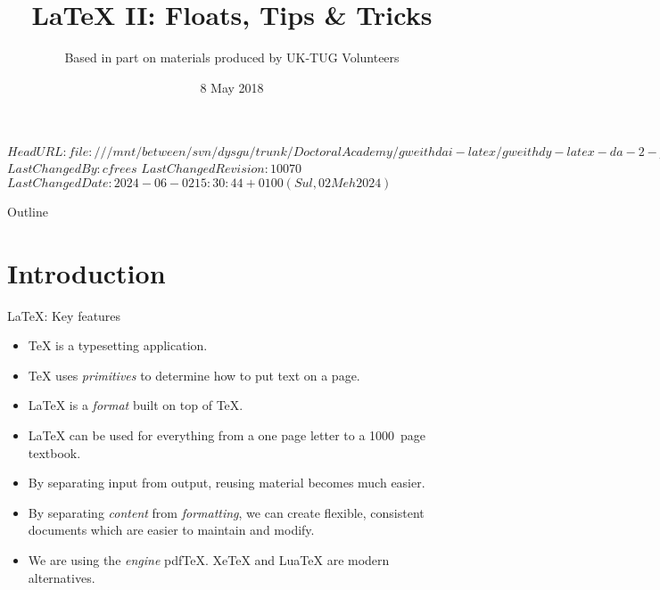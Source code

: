 \svnidlong
{$HeadURL: file:///mnt/between/svn/dysgu/trunk/DoctoralAcademy/gweithdai-latex/gweithdy-latex-da-2-pellach/training.tex $}
{$LastChangedBy: cfrees $}
{$LastChangedRevision: 10070 $}
{$LastChangedDate: 2024-06-02 15:30:44 +0100 (Sul, 02 Meh 2024) $}

\usepackage[citestyle=authoryear-comp,bibstyle=authoryear,mergedate=basic,isbn=false,url=true,sortcites=true,backend=biber,mincrossrefs=6]{biblatex}




{
  \usetikzlibrary{quotes,automata,positioning,bending,shadows,shapes.arrows}
  \usepackage{tikz-cd}
}


\title{\LaTeX{} II: Floats, Tips \& Tricks}
\subtitle{Based in part on materials produced by UK-TUG Volunteers}
\date{ 8 May 2018}




\begin{frame}
  \titlepage
\end{frame}

\maketitle


\tableofcontents

%
{
  \begin{frame}{Outline}
	\tableofcontents
  \end{frame}
}

%

\section{Introduction}

\begin{frame}{\LaTeX{}: Key features}

  \begin{itemize}
	\item \TeX{} is a typesetting application.
	\item \TeX{} uses \emph{primitives} to determine how to put text on a page.
	\item \LaTeX{} is  a \emph{format} built on top of \TeX{}.
	\item \LaTeX{} can be used for everything from a one page letter to a 1000~page textbook.
	\item By separating input from output, reusing material becomes much easier.
	\item By separating \emph{content} from \emph{formatting}, we can create flexible, consistent documents which are easier to maintain and modify.
	\item We are using the \emph{engine} pdf\TeX{}.
	Xe\TeX{} and Lua\TeX{} are modern alternatives.
  \end{itemize}

\end{frame}

